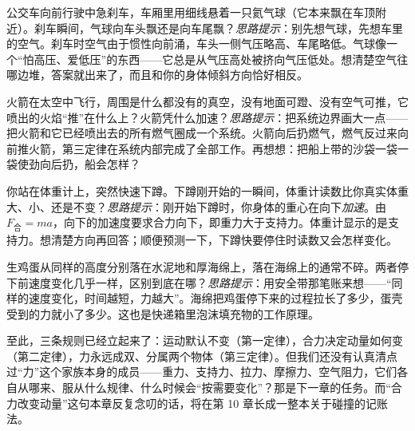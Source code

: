 \begin{puzzles}
\item 公交车向前行驶中急刹车，车厢里用细线悬着一只氦气球（它本来飘在车顶附近）。刹车瞬间，气球向车头飘还是向车尾飘？\emph{思路提示}：别先想气球，先想车里的空气。刹车时空气由于惯性向前涌，车头一侧气压略高、车尾略低。气球像一个“怕高压、爱低压”的东西——它总是从气压高处被挤向气压低处。想清楚空气往哪边堆，答案就出来了，而且和你的身体倾斜方向恰好相反。
\item 火箭在太空中飞行，周围是什么都没有的真空，没有地面可蹬、没有空气可推，它喷出的火焰“推”在什么上？火箭凭什么加速？\emph{思路提示}：把系统边界画大一点——把火箭和它已经喷出去的所有燃气圈成一个系统。火箭向后扔燃气，燃气反过来向前推火箭，第三定律在系统内部完成了全部工作。再想想：把船上带的沙袋一袋一袋使劲向后扔，船会怎样？
\item 你站在体重计上，突然快速下蹲。下蹲刚开始的一瞬间，体重计读数比你真实体重大、小、还是不变？\emph{思路提示}：刚开始下蹲时，你身体的重心在向下\emph{加速}。由 \(F_{\text{合}}=ma\)，向下的加速度要求合力向下，即重力大于支持力。体重计显示的是支持力。想清楚方向再回答；顺便预测一下，下蹲快要停住时读数又会怎样变化。
\item 生鸡蛋从同样的高度分别落在水泥地和厚海绵上，落在海绵上的通常不碎。两者停下前速度变化几乎一样，区别到底在哪？\emph{思路提示}：用安全带那笔账来想——“同样的速度变化，时间越短，力越大”。海绵把鸡蛋停下来的过程拉长了多少，蛋壳受到的力就小了多少。这也是快递箱里泡沫填充物的工作原理。
\end{puzzles}

至此，三条规则已经立起来了：运动默认不变（第一定律），合力决定动量如何变（第二定律），力永远成双、分属两个物体（第三定律）。但我们还没有认真清点过“力”这个家族本身的成员——重力、支持力、拉力、摩擦力、空气阻力，它们各自从哪来、服从什么规律、什么时候会“按需要变化”？那是下一章的任务。而“合力改变动量”这句本章反复念叨的话，将在第 10 章长成一整本关于碰撞的记账法。

